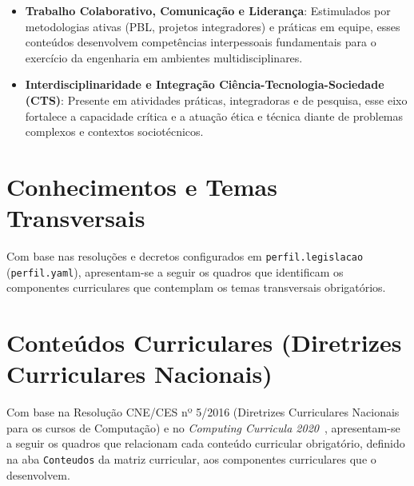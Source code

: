\begin{itemize}
\item \textbf{Trabalho Colaborativo, Comunicação e Liderança}: Estimulados por metodologias ativas (PBL, projetos integradores) e práticas em equipe, esses conteúdos desenvolvem competências interpessoais fundamentais para o exercício da engenharia em ambientes multidisciplinares.

\item \textbf{Interdisciplinaridade e Integração Ciência-Tecnologia-Sociedade (CTS)}: Presente em atividades práticas, integradoras e de pesquisa, esse eixo fortalece a capacidade crítica e a atuação ética e técnica diante de problemas complexos e contextos sociotécnicos.

\end{itemize}

\section{Conhecimentos e Temas Transversais}

Com base nas resoluções e decretos configurados em \texttt{perfil.legislacao} (\texttt{perfil.yaml}), apresentam-se a seguir os quadros que identificam os componentes curriculares que contemplam os temas transversais obrigatórios.


\section{Conteúdos Curriculares (Diretrizes Curriculares Nacionais)}

Com base na Resolução CNE/CES nº 5/2016 (Diretrizes Curriculares Nacionais para os cursos de Computação) e no \textit{Computing Curricula 2020}~\cite{acm_cc2020}, apresentam-se a seguir os quadros que relacionam cada conteúdo curricular obrigatório, definido na aba \texttt{Conteudos} da matriz curricular, aos componentes curriculares que o desenvolvem.


